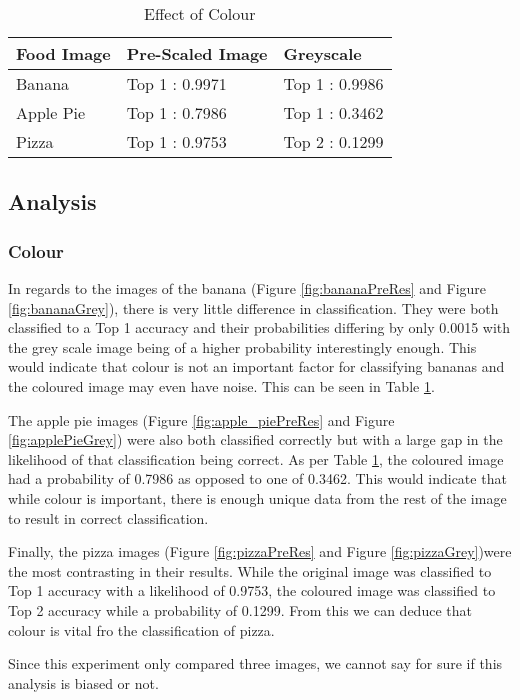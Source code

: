 \begin{table}[]
\centering
\caption{Effect of Colour}
\label{colour}
\begin{tabular}{|l|l|l|}
\hline
\textbf{Food Image} & \textbf{Pre-Scaled Image} & \textbf{Greyscale}      \\ \hline
Banana     & Top 1 : 0.9971   & Top 1 : 0.9986 \\ \hline
Apple Pie  & Top 1 : 0.7986   & Top 1 : 0.3462   \\ \hline
Pizza      & Top 1 : 0.9753   & Top 2 : 0.1299 \\ \hline
\end{tabular}
\end{table}

\subsection*{Analysis}
\subsubsection*{Colour}
In regards to the images of the banana (Figure \ref{fig:bananaPreRes} and Figure \ref{fig:bananaGrey}), there is very little difference in classification. They were both classified to a Top 1 accuracy and their probabilities differing by only 0.0015 with the grey scale image being of a higher probability interestingly enough. This would indicate that colour is not an important factor for classifying bananas and the coloured image may even have noise. This can be seen in Table \ref{colour}.

The apple pie images (Figure \ref{fig:apple_piePreRes} and Figure \ref{fig:applePieGrey}) were also both classified correctly but with a large gap in the likelihood of that classification being correct. As per Table \ref{colour}, the coloured image had a probability of 0.7986 as opposed to one of 0.3462. This would indicate that while colour is important, there is enough unique data from the rest of the image to result in correct classification.

Finally, the pizza images (Figure \ref{fig:pizzaPreRes} and Figure \ref{fig:pizzaGrey})were the most contrasting in their results. While the original image was classified to Top 1 accuracy with a likelihood of 0.9753, the coloured image was classified to Top 2 accuracy while a probability of 0.1299. From this we can deduce that colour is vital fro the classification of pizza.

Since this experiment only compared three images, we cannot say for sure if this analysis is biased or not.

